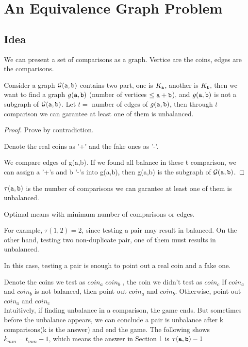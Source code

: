 \section{An Equivalence Graph Problem}


\subsection*{Idea}

We can present a set of comparisons as a graph. Vertice are the coins, edges are the comparisons.

Consider a graph ${\cal G}(\mathtt{a},\mathtt{b})$ contains two part, one is $K_{\mathtt{a}}$, another is $K_{\mathtt{b}}$, then we want to find a graph $g(\mathtt{a},\mathtt{b})$ (number of vertices $\leq \mathtt{a}+\mathtt{b}$), and $g(\mathtt{a},\mathtt{b})$ is not a subgraph of ${\cal G}(\mathtt{a},\mathtt{b})$. 
Let $t =$ number of edges of $g(\mathtt{a},\mathtt{b})$, then through $t$ comparison we can garantee at least one of them is unbalanced.

\begin{proof}

Prove by contradiction.

Denote the real coins as '+' and the fake ones as '-'. 

We compare edges of g(a,b). If we found all balance in these t comparison, we can assign a '+'s and b '-'s into g(a,b), then g(a,b) is the subgraph of ${\cal G}(\mathtt{a},\mathtt{b})$.
\end{proof}

\begin{definition}
$\tau(\mathtt{a},\mathtt{b})$ is the number of comparisons we can garantee at least one of them is unbalanced.

Optimal means with minimum number of comparisons or edges.
\end{definition}

For example, $\tau(1,2)=2$, since testing a pair may result in balanced. On the other hand, testing two non-duplicate pair, one of them must results in unbalanced.

In this case, testing a pair is enough to point out a real coin and a fake one. 

Denote the coins we test as $coin_a$ $coin_b$ , the coin we didn't test as $coin_c$
If $coin_a$ and $coin_b$ is not balanced, then point out $coin_a$ and $coin_b$. Otherwise, point out $coin_a$ and $coin_c$
\\

Intuitively, if finding unbalance in a comparison, the game ends. But sometimes before the unbalance appears, we can conclude a pair is unbalance after k comparisons(k is the answer) and end the game. The following shows $k_{min}=t_{min}-1$, which means the answer in Section 1 is $\tau(\mathtt{a},\mathtt{b})-1$

